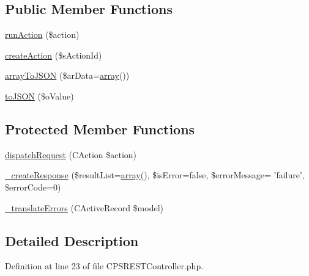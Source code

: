 \subsection*{Public Member Functions}
\begin{DoxyCompactItemize}
\item 
\hyperlink{classCPSRESTController_a35edd2b48289866a074a06910ec85865}{runAction} (\$action)
\item 
\hyperlink{classCPSRESTController_ae6184c2ab5f3c23fd889d48f6cb7b675}{createAction} (\$sActionId)
\item 
\hyperlink{classCPSRESTController_af9f23d22326ba3616718f2160c36c066}{arrayToJSON} (\$arData=\hyperlink{list_8php_aa3205d038c7f8feb5c9f01ac4dfadc88}{array}())
\item 
\hyperlink{classCPSRESTController_a251aab9c88e5099680934f222b08201f}{toJSON} (\$oValue)
\end{DoxyCompactItemize}
\subsection*{Protected Member Functions}
\begin{DoxyCompactItemize}
\item 
\hyperlink{classCPSRESTController_ac6e10189b95edb3c6b4e1c5128f7637f}{dispatchRequest} (CAction \$action)
\item 
\hyperlink{classCPSRESTController_ab3dd823ad0aaa9d02a55cd158f87c5ec}{\_\-createResponse} (\$resultList=\hyperlink{list_8php_aa3205d038c7f8feb5c9f01ac4dfadc88}{array}(), \$isError=false, \$errorMessage= 'failure', \$errorCode=0)
\item 
\hyperlink{classCPSRESTController_abb8737486fa4ce063137238992c6d718}{\_\-translateErrors} (CActiveRecord \$model)
\end{DoxyCompactItemize}


\subsection{Detailed Description}


Definition at line 23 of file CPSRESTController.php.



